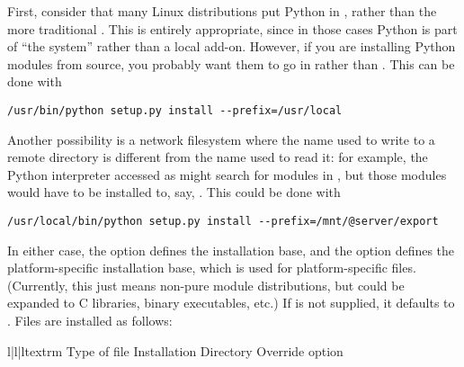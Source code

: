 \documentclass{howto}
\begin{document}
First, consider that many Linux distributions put Python in ,
rather than the more traditional .  This is entirely
appropriate, since in those cases Python is part of ``the system''
rather than a local add-on.  However, if you are installing Python
modules from source, you probably want them to go in
 rather than
.  This can be done with

\begin{verbatim}
/usr/bin/python setup.py install --prefix=/usr/local
\end{verbatim}

Another possibility is a network filesystem where the name used to write
to a remote directory is different from the name used to read it: for
example, the Python interpreter accessed as 
might search for modules in ,
but those modules would have to be installed to, say,
.  This
could be done with

\begin{verbatim}
/usr/local/bin/python setup.py install --prefix=/mnt/@server/export
\end{verbatim}

In either case, the  option defines the
installation base, and the  option defines
the platform-specific installation base, which is used for
platform-specific files.  (Currently, this just means non-pure module
distributions, but could be expanded to C libraries, binary executables,
etc.)  If  is not supplied, it defaults to
.  Files are installed as follows:

\begin{tableiii}{l|l|l}{textrm}
          {Type of file}
          {Installation Directory}
          {Override option}
             {}
             {}
             {}
             {}
             {}
             {}
             {}
             {}
\end{tableiii}
\end{document}
